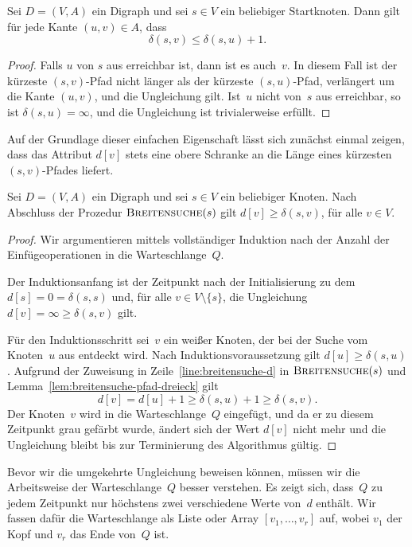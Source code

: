 \begin{lem}
\label{lem:breitensuche-pfad-dreieck}
Sei $D=(V,A)$ ein Digraph und sei $s \in V$ ein beliebiger Startknoten.
Dann gilt für jede Kante $(u,v) \in A$, dass
\[
\delta(s,v) \leq \delta(s,u) + 1.
\]
\end{lem}

\begin{proof}
Falls $u$ von $s$ aus erreichbar ist, dann ist es auch~$v$.
In diesem Fall ist der kürzeste $(s,v)$-Pfad nicht länger als der kürzeste $(s,u)$-Pfad, verlängert um die Kante $(u,v)$, und die Ungleichung gilt.
Ist~$u$ nicht von~$s$ aus erreichbar, so ist $\delta(s,u)=\infty$, und die Ungleichung ist trivialerweise erfüllt.
\end{proof}

Auf der Grundlage dieser einfachen Eigenschaft lässt sich zunächst einmal zeigen, dass das Attribut $d[v]$ stets eine obere Schranke an die Länge eines kürzesten $(s,v)$-Pfades liefert.

\begin{lem}
\label{lem:breitensuche-d-geq-delta}
Sei $D=(V,A)$ ein Digraph und sei $s \in V$ ein beliebiger Knoten.
Nach Abschluss der Prozedur $\mathop{\text{\textsc{Breitensuche}}}(s)$ gilt $d[v] \geq \delta(s,v)$, für alle $v \in V$.
\end{lem}

\begin{proof}
Wir argumentieren mittels vollständiger Induktion nach der Anzahl der Ein\-füge\-operationen in die Warteschlange~$Q$.

Der Induktionsanfang ist der Zeitpunkt nach der Initialisierung zu dem $d[s]=0=\delta(s,s)$ und, für alle $v \in V \setminus \{s\}$, die Ungleichung $d[v]=\infty\geq\delta(s,v)$ gilt.

Für den Induktionsschritt sei~$v$ ein weißer Knoten, der bei der Suche vom Knoten~$u$ aus entdeckt wird.
Nach Induktionsvoraussetzung gilt $d[u] \geq \delta(s,u)$.
Aufgrund der Zuweisung in Zeile~\ref{line:breitensuche-d} in $\mathop{\text{\textsc{Breitensuche}}}(s)$ und Lemma~\ref{lem:breitensuche-pfad-dreieck} gilt
\[
d[v] = d[u] + 1 \geq \delta(s,u) + 1 \geq \delta(s,v).
\]
Der Knoten~$v$ wird in die Warteschlange~$Q$ eingefügt, und da er zu diesem Zeitpunkt grau gefärbt wurde, ändert sich der Wert $d[v]$ nicht mehr und die Ungleichung bleibt bis zur Terminierung des Algorithmus gültig.
\end{proof}

Bevor wir die umgekehrte Ungleichung beweisen können, müssen wir die Arbeitsweise der Warteschlange~$Q$ besser verstehen.
Es zeigt sich, dass~$Q$ zu jedem Zeitpunkt nur höchstens zwei verschiedene Werte von~$d$ enthält.
Wir fassen dafür die Warteschlange als Liste oder Array $[v_1,\ldots,v_r]$ auf, wobei $v_1$ der Kopf und $v_r$ das Ende von~$Q$ ist.

